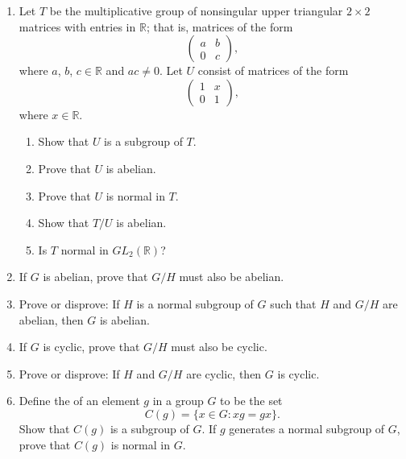 \begin{enumerate}
 
\item
Let $T$ be the multiplicative group of nonsingular upper triangular $2 \times 2$
matrices with entries in ${\mathbb R}$; that is, matrices of the form
\[
\begin{pmatrix}
a & b \\
0 & c
\end{pmatrix},
\]
where $a$, $b$, $c \in {\mathbb R}$ and $ac \neq 0$. Let $U$ consist of
matrices of the form 
\[
\begin{pmatrix}
1 & x \\
0 & 1
\end{pmatrix},
\]
where $x \in {\mathbb R}$.
\begin{enumerate}
 
 \item 
Show that $U$ is a subgroup of $T$.
 
 \item 
Prove that $U$ is abelian.
 
 \item 
Prove that $U$ is normal in $T$.
 
 \item  
Show that $T/U$ is abelian.
 
 \item
Is $T$ normal in $GL_2( {\mathbb R})$?
 
\end{enumerate}



\item
If $G$ is abelian, prove that $G/H$ must also be abelian.
 
\item
Prove or disprove: If $H$ is a normal subgroup of $G$ such that $H$
and $G/H$ are abelian, then $G$ is abelian. 
 
 

\item
If $G$ is cyclic, prove that $G/H$ must also be cyclic.


\item
Prove or disprove: If $H$ and $G/H$ are cyclic, then $G$ is cyclic.
 
 

\item
Define the  of an element $g$ in a group $G$
to be the set  
\[
C(g) = \{ x \in G : xg = gx \}.
\]
Show that $C(g)$ is a subgroup of $G$.  If $g$ generates a normal
subgroup of $G$, prove that $C(g)$ is normal in $G$.
 

\end{enumerate}

